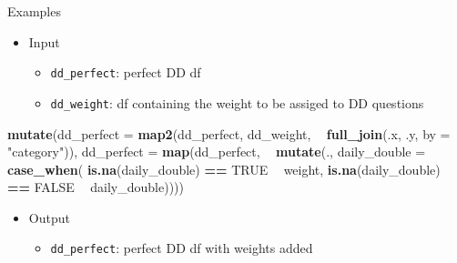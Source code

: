 \documentclass[
  ignorenonframetext,
]{beamer}
\newenvironment{Shaded}{\begin{snugshade}}{\end{snugshade}}
\newcommand{\DataTypeTok}[1]{\textcolor[rgb]{0.13,0.29,0.53}{#1}}
\newcommand{\KeywordTok}[1]{\textcolor[rgb]{0.13,0.29,0.53}{\textbf{#1}}}
\newcommand{\NormalTok}[1]{#1}
\newcommand{\OperatorTok}[1]{\textcolor[rgb]{0.81,0.36,0.00}{\textbf{#1}}}
\newcommand{\OtherTok}[1]{\textcolor[rgb]{0.56,0.35,0.01}{#1}}
\newcommand{\StringTok}[1]{\textcolor[rgb]{0.31,0.60,0.02}{#1}}
\providecommand{\tightlist}{%
  \setlength{\itemsep}{0pt}\setlength{\parskip}{0pt}}
\begin{document}
\begin{frame}[fragile]{Examples}
\protect\hypertarget{examples-1}{}

\begin{itemize}
\tightlist
\item
  Input

  \begin{itemize}
  \tightlist
  \item
    \texttt{dd\_perfect}: perfect DD df
  \item
    \texttt{dd\_weight}: df containing the weight to be assiged to DD
    questions
  \end{itemize}
\end{itemize}

\begin{Shaded}
\begin{Highlighting}[]
\KeywordTok{mutate}\NormalTok{(}\DataTypeTok{dd_perfect =} \KeywordTok{map2}\NormalTok{(dd_perfect, dd_weight,}
                \OperatorTok{~}\StringTok{ }\KeywordTok{full_join}\NormalTok{(.x, .y, }\DataTypeTok{by =} \StringTok{"category"}\NormalTok{)),}
\DataTypeTok{dd_perfect =} \KeywordTok{map}\NormalTok{(dd_perfect, }
                 \OperatorTok{~}\StringTok{ }\KeywordTok{mutate}\NormalTok{(., }\DataTypeTok{daily_double =} \KeywordTok{case_when}\NormalTok{(}
                   \KeywordTok{is.na}\NormalTok{(daily_double) }\OperatorTok{==}\StringTok{ }\OtherTok{TRUE} \OperatorTok{~}\StringTok{ }\NormalTok{weight,}
                   \KeywordTok{is.na}\NormalTok{(daily_double) }\OperatorTok{==}\StringTok{ }\OtherTok{FALSE} \OperatorTok{~}\StringTok{ }\NormalTok{daily_double))))}
\end{Highlighting}
\end{Shaded}

\begin{itemize}
\tightlist
\item
  Output

  \begin{itemize}
  \tightlist
  \item
    \texttt{dd\_perfect}: perfect DD df with weights added
  \end{itemize}
\end{itemize}

\end{frame}
\end{document}
